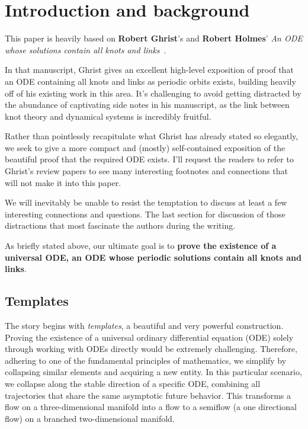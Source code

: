 \documentclass[main.tex]{subfiles}
\begin{document}
\section{Introduction and background}



This paper is heavily based on \textbf{Robert Ghrist}'s and \textbf{Robert Holmes}' \emph{An ODE whose solutions contain all knots and links}~\cite{knottyode}.

In that manuscript, Ghrist gives an excellent high-level exposition of proof that an ODE containing
all knots and links as periodic orbits exists, building heavily off of his existing work in this area. It's challenging to avoid getting distracted by the abundance of captivating side notes in his manuscript, as the link between knot theory and dynamical systems is incredibly fruitful.

Rather than pointlessly recapitulate what Ghrist has already stated so elegantly, we seek to give a more compact and (mostly) self-contained exposition of the beautiful proof that the required ODE exists. I'll request the readers to refer to Ghrist's review papers \cite{knottyode}\cite{chaoticknots} to see many interesting footnotes and connections that will not make it into this paper.

We will inevitably be unable to resist the temptation to discuss at least a few interesting connections and questions. The last section for discussion of those distractions that most fascinate the authors during the writing.

As briefly stated above, our ultimate goal is to \textbf{prove the existence of a universal ODE, an ODE whose periodic solutions contain all knots and links}.


\subsection{Templates}

The story begins with \emph{templates}, a beautiful and very powerful construction. Proving the existence of a universal ordinary differential equation (ODE) solely through working with ODEs directly would be extremely challenging. Therefore, adhering to one of the fundamental principles of mathematics, we simplify by collapsing similar elements and acquiring a new entity. In this particular scenario, we collapse along the stable direction of a specific ODE, combining all trajectories that share the same asymptotic future  behavior.
This transforms a flow on a three-dimensional manifold into a flow to a semiflow (a one directional flow) on a branched two-dimensional manifold.
\end{document}

